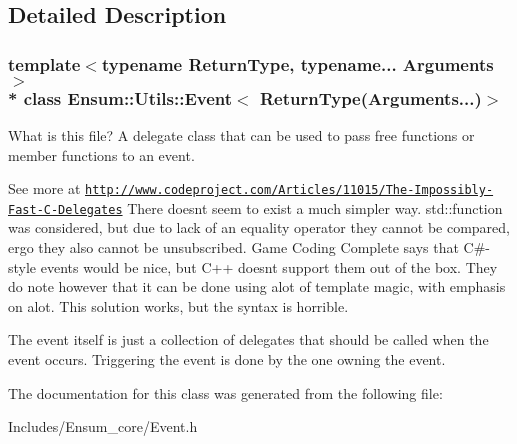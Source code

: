 \subsection{Detailed Description}
\subsubsection*{template$<$typename Return\+Type, typename... Arguments$>$\\*
class Ensum\+::\+Utils\+::\+Event$<$ Return\+Type(\+Arguments...)$>$}

What is this file? A delegate class that can be used to pass free functions or member functions to an event. 

See more at \href{http://www.codeproject.com/Articles/11015/The-Impossibly-Fast-C-Delegates}{\tt http\+://www.\+codeproject.\+com/\+Articles/11015/\+The-\/\+Impossibly-\/\+Fast-\/\+C-\/\+Delegates} There doesn\textquotesingle{}t seem to exist a much simpler way. std\+::function was considered, but due to lack of an equality operator they cannot be compared, ergo they also cannot be unsubscribed. Game Coding Complete says that C\#-\/style events would be nice, but C++ doesn\textquotesingle{}t support them out of the box. They do note however that it can be done using alot of template magic, with emphasis on alot. This solution works, but the syntax is horrible.

The event itself is just a collection of delegates that should be called when the event occurs. Triggering the event is done by the one owning the event. 

The documentation for this class was generated from the following file\+:\begin{DoxyCompactItemize}
\item 
Includes/\+Ensum\+\_\+core/Event.\+h\end{DoxyCompactItemize}
